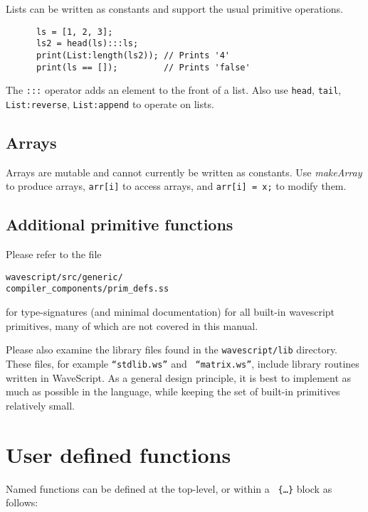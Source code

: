 \documentclass[twocolumn]{report}
\begin{document}
Lists can be written as constants and support the usual primitive
operations.  
\begin{verbatim}
      ls = [1, 2, 3];
      ls2 = head(ls):::ls;
      print(List:length(ls2)); // Prints '4'
      print(ls == []);         // Prints 'false'
\end{verbatim}

The {\tt :::} operator adds an element to the front of a list.  Also
use {\tt head}, {\tt tail}, {\tt List:reverse}, {\tt List:append} to operate on
lists. 

\subsection{Arrays}

Arrays are mutable and cannot currently be written as constants.  Use
{\em makeArray} to produce arrays, {\tt arr[i]} to access arrays, and
{\tt arr[i] = x;} to modify them.


\subsection{Additional primitive functions}

Please refer to the file 
\vspace{-2mm}
\begin{center}
{\tt{wavescript/src/generic/\\compiler\_components/prim\_defs.ss}}
\end{center}

for type-signatures (and minimal documentation) for all built-in
wavescript primitives, many of which are not covered in this manual.

Please also examine the library files found in the {\tt wavescript/lib}
directory.  These files, for example {\tt ``stdlib.ws''} and {\tt
  ``matrix.ws''}, include library routines written in WaveScript.  As
a general design principle, it is best to implement as much as
possible in the language, while keeping the set of built-in primitives
relatively small.


\section{User defined functions}
\label{udfs}

Named functions can be defined at the top-level, or within a {\tt
  \{\ldots\}} block as follows:
\end{document}
